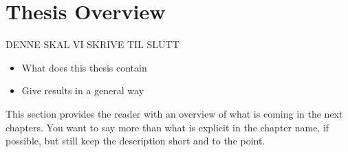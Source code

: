 \section{Thesis Overview}

DENNE SKAL VI SKRIVE TIL SLUTT

\begin{itemize}
\item What does this thesis contain
\item Give results in a general way
\end{itemize}

This section provides the reader with an overview of what is coming in the next
chapters. You want to say more than what is explicit in the chapter name, if
possible, but still keep the description short and to the point.